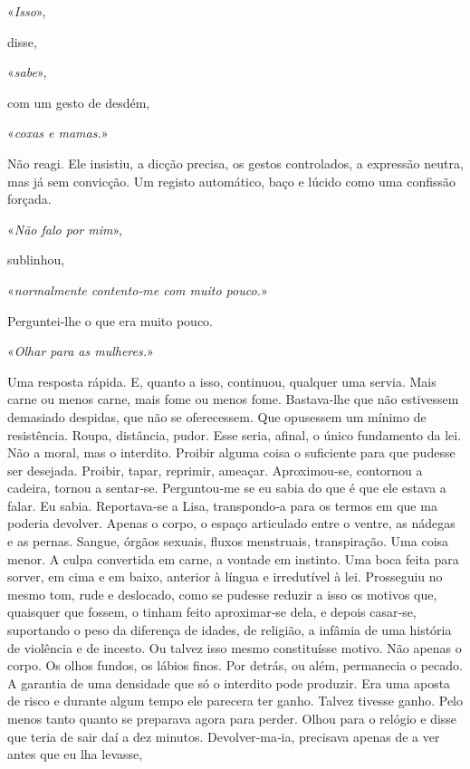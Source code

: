 «\emph{Isso}»,

disse,

«\emph{sabe}»,

com um gesto de desdém,

«\emph{coxas e mamas.}»

Não reagi. Ele insistiu, a dicção precisa, os gestos controlados, a
expressão neutra, mas já sem convicção. Um registo automático, baço e
lúcido como uma confissão forçada.

«\emph{Não falo por mim}»,

sublinhou,

«\emph{normalmente contento­‑me com muito pouco.}»

Perguntei­‑lhe o que era muito pouco.

«\emph{Olhar para as mulheres.}»

Uma resposta rápida. E, quanto a isso, continuou, qualquer uma servia.
Mais carne ou menos carne, mais fome ou menos fome. Bastava­‑lhe que não
estivessem demasiado despidas, que não se oferecessem. Que opusessem um
mínimo de resistência. Roupa, distância, pudor. Esse seria, afinal, o
único fundamento da lei. Não a moral, mas o interdito. Proibir alguma
coisa o suficiente para que pudesse ser desejada. Proibir, tapar,
reprimir, ameaçar. Aproximou­‑se, contornou a cadeira, tornou a
sentar­‑se. Perguntou­‑me se eu sabia do que é que ele estava a falar.
Eu sabia. Reportava­‑se a Lisa, transpondo­‑a para os termos em que ma
poderia devolver. Apenas o corpo, o espaço articulado entre o ventre, as
nádegas e as pernas. Sangue, órgãos sexuais, fluxos menstruais,
transpiração. Uma coisa menor. A culpa convertida em carne, a vontade em
instinto. Uma boca feita para sorver, em cima e em baixo, anterior à
língua e irredutível à lei. Prosseguiu no mesmo tom, rude e deslocado,
como se pudesse reduzir a isso os motivos que, quaisquer que fossem, o
tinham feito aproximar­‑se dela, e depois casar­‑se, suportando o peso
da diferença de idades, de religião, a infâmia de uma história de
violência e de incesto. Ou talvez isso mesmo constituísse motivo. Não
apenas o corpo. Os olhos fundos, os lábios finos. Por detrás, ou além,
permanecia o pecado. A garantia de uma densidade que só o interdito pode
produzir. Era uma aposta de risco e durante algum tempo ele parecera ter
ganho. Talvez tivesse ganho. Pelo menos tanto quanto se preparava agora
para perder. Olhou para o relógio e disse que teria de sair daí a dez
minutos. Devolver­‑ma­‑ia, precisava apenas de a ver antes que eu lha
levasse,

